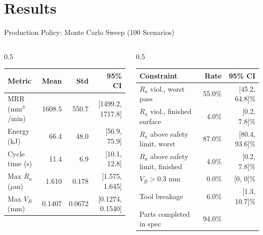\documentclass[11pt,aspectratio=169]{beamer}
\newcommand{\MRR}{\mathrm{MRR}}
\newcommand{\Ra}{R_a}
\newcommand{\VB}{V_B}
\begin{document}
\section{Results}

\begin{frame}{Production Policy: Monte Carlo Sweep (100 Scenarios)}
    \small
    \begin{columns}[T]
        \begin{column}{0.5\textwidth}
            \centering
            \scriptsize
            \begin{tabular}{@{}lrrr@{}}
            \toprule
            \textbf{Metric} & \textbf{Mean} & \textbf{Std} & \textbf{95\% CI} \\
            \midrule
            $\MRR$ (mm$^3$/min) & 1608.5 & 550.7 & [1499.2, 1717.8] \\
            Energy (kJ) & 66.4 & 48.0 & [56.9, 75.9] \\
            Cycle time (s) & 11.4 & 6.9 & [10.1, 12.8] \\
            Max $\Ra$ ($\mu$m) & 1.610 & 0.178 & [1.575, 1.645] \\
            Max $\VB$ (mm) & 0.1407 & 0.0672 & [0.1274, 0.1540] \\
            \bottomrule
            \end{tabular}
        \end{column}
        \begin{column}{0.5\textwidth}
            \centering
            \scriptsize
            \begin{tabular}{@{}lrr@{}}
            \toprule
            \textbf{Constraint} & \textbf{Rate} & \textbf{95\% CI} \\
            \midrule
            $\Ra$ viol., worst pass & 55.0\% & [45.2, 64.8]\% \\
            $\Ra$ viol., finished surface & 4.0\% & [0.2, 7.8]\% \\
            $\Ra$ above safety limit, worst & 87.0\% & [80.4, 93.6]\% \\
            $\Ra$ above safety limit, finished & 4.0\% & [0.2, 7.8]\% \\
            $\VB > 0.3$ mm & \alert{0.0\%} & [0, 0]\% \\
            Tool breakage & 6.0\% & [1.3, 10.7]\% \\
            Parts completed in spec & 94.0\% & \\
            \bottomrule
            \end{tabular}
        \end{column}
    \end{columns}


\end{frame}
\end{document}
